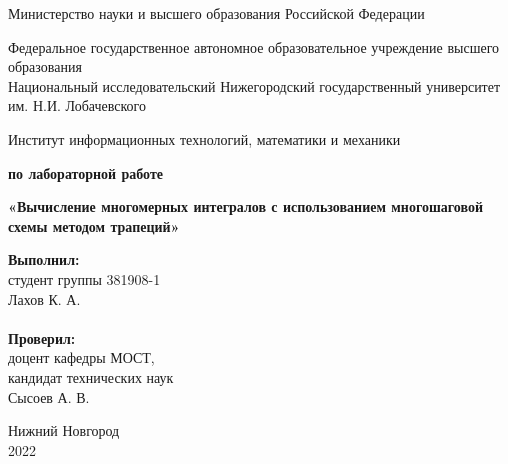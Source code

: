 \documentclass{report}
\begin{document}
\begin{titlepage}

\begin{center}
Министерство науки и высшего образования Российской Федерации
\end{center}

\begin{center}
Федеральное государственное автономное образовательное учреждение высшего образования \\
Национальный исследовательский Нижегородский государственный университет им. Н.И. Лобачевского
\end{center}

\begin{center}
Институт информационных технологий, математики и механики
\end{center}

\vspace{4em}

\begin{center}
\textbf{ по лабораторной работе} \\
\end{center}
\begin{center}
\textbf{\Large«Вычисление многомерных интегралов с использованием многошаговой схемы методом трапеций»} \\
\end{center}

\vspace{4em}

\newbox{\lbox}
\newlength{\maxl}
\setlength{\maxl}{\wd\lbox}
\hfill\parbox{7cm}{
\hspace*{5cm}\hspace*{-5cm}\textbf{Выполнил:} \\ студент группы 381908-1 \\ Лахов К. А.\\
\\
\hspace*{5cm}\hspace*{-5cm}\textbf{Проверил:}\\ доцент кафедры МОСТ, \\ кандидат технических наук \\ Сысоев А. В.\\
}
\vspace{\fill}

\begin{center} Нижний Новгород \\ 2022 \end{center}

\end{titlepage}
\end{document}
